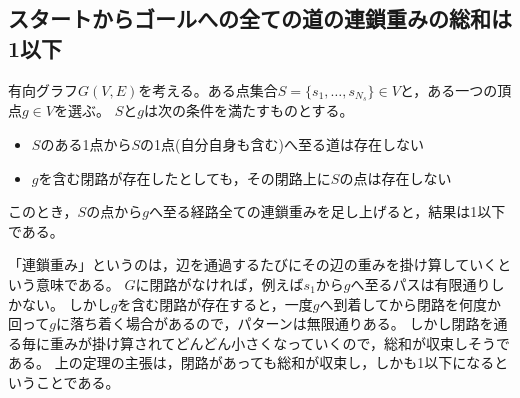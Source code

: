         \subsection{スタートからゴールへの全ての道の連鎖重みの総和は1以下}
            \begin{shadebox}
                有向グラフ$G(V,E)$を考える。ある点集合$S = \{s_1,\dotsc,s_{N_s}\}\in V$と，ある一つの頂点$g\in V$を選ぶ。
                $S$と$g$は次の条件を満たすものとする。
                \begin{itemize}
                    \item $S$のある1点から$S$の1点(自分自身も含む)へ至る道は存在しない
                    \item $g$を含む閉路が存在したとしても，その閉路上に$S$の点は存在しない
                \end{itemize}
                このとき，$S$の点から$g$へ至る経路全ての連鎖重みを足し上げると，結果は1以下である。
            \end{shadebox}
            「連鎖重み」というのは，辺を通過するたびにその辺の重みを掛け算していくという意味である。
            $G$に閉路がなければ，例えば$s_1$から$g$へ至るパスは有限通りしかない。
            しかし$g$を含む閉路が存在すると，一度$g$へ到着してから閉路を何度か回って$g$に落ち着く場合があるので，パターンは無限通りある。
            しかし閉路を通る毎に重みが掛け算されてどんどん小さくなっていくので，総和が収束しそうである。
            上の定理の主張は，閉路があっても総和が収束し，しかも1以下になるということである。

